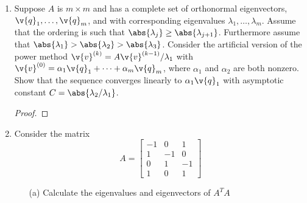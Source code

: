 \documentclass[11pt]{article}
\begin{document}
\begin{enumerate}
    \item %
        Suppose $A$ is $m \times m$ and has a complete set of orthonormal
        eigenvectors, $\v{q}_1, \ldots, \v{q}_m$, and with corresponding
        eigenvalues $\lambda_1, \ldots, \lambda_m$.
        Assume that the ordering is such that
        $\abs{\lambda_j} \ge \abs{\lambda_{j+1}}$.
        Furthermore assume that
        $\abs{\lambda_1} > \abs{\lambda_2} > \abs{\lambda_3}$.
        Consider the artificial version of the power method
        $\v{v}^{(k)} = A\v{v}^{(k-1)}/\lambda_1$ with
        $\v{v}^{(0)} = \alpha_1 \v{q}_1 + \cdots + \alpha_m \v{q}_m$, where
        $\alpha_1$ and $\alpha_2$ are both nonzero.
        Show that the sequence converges linearly to $\alpha_1 \v{q}_1$ with
        asymptotic constant $C = \abs{\lambda_2/\lambda_1}$.

        \begin{proof}
            
        \end{proof}

    \item %
        Consider the matrix
        \[
            A =
            \begin{bmatrix}
                -1 &  0 &  1 \\
                 1 & -1 &  0 \\
                 0 &  1 & -1 \\
                 1 &  0 &  1
            \end{bmatrix}
        \]
        \begin{enumerate}
            \item[(a)] %
                Calculate the eigenvalues and eigenvectors of $A^T A$


\end{enumerate}
\end{enumerate}
\end{document}
